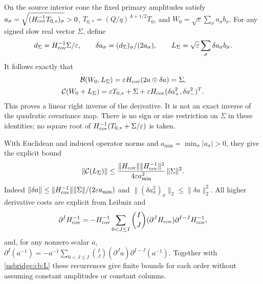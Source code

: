 \documentclass[11pt]{article}
\newcommand{\Cov}{\mathcal C}
\newcommand{\Cross}{\mathcal B}
\begin{document}
On the source interior cone the fixed primary amplitudes satisfy
$a_\sigma=\sqrt{(H_{\rm cov}^{-1}T_{0,*})_\sigma}>0$,
$T_{0,*}=(Q/q)^{A+1/2}T_0$, and
$W_0=\sqrt\varepsilon\sum_\sigma a_\sigma b_\sigma$.
For any signed slow real vector $\Sigma$, define
\begin{equation}
 d_\Sigma=H_{\rm cov}^{-1}\Sigma/\varepsilon,\qquad
 \delta a_\sigma=(d_\Sigma)_\sigma/(2a_\sigma),\qquad
 L_\Sigma=\sqrt\varepsilon\sum_\sigma\delta a_\sigma b_\sigma .
 \label{nsbridge:cb:L}
\end{equation}
It follows exactly that
\begin{gather}
 \Cross(W_0,L_\Sigma)=\varepsilon H_{\rm cov}(2a\odot\delta a)=\Sigma,
 \label{nsbridge:cb:inverse}\\
 \Cov(W_0+L_\Sigma)
   =\varepsilon T_{0,*}+\Sigma+
       \varepsilon H_{\rm cov}(\delta a_+^2,\delta a_-^2)^T.
 \label{nsbridge:cb:quad}
\end{gather}
This proves a linear right inverse of the derivative. It is not an
exact inverse of the quadratic covariance map. There is no sign or
size restriction on $\Sigma$ in these identities; no square root of
$H_{\rm cov}^{-1}(T_{0,*}+\Sigma/\varepsilon)$ is taken.

With Euclidean and induced operator norms and
$a_{\min}=\min_\sigma|a_\sigma|>0$, they give the explicit bound
\begin{equation}
 \|\Cov(L_\Sigma)\|\le
 \frac{\|H_{\rm cov}\|\|H_{\rm cov}^{-1}\|^2}
              {4\varepsilon a_{\min}^2}\,\|\Sigma\|^2. \label{nsbridge:cb:bound}
\end{equation}
Indeed $\|\delta a\|\le\|H_{\rm cov}^{-1}\|\|\Sigma\|/
(2\varepsilon a_{\min})$ and
$\|(\delta a_\sigma^2)_\sigma\|_2\le\|\delta a\|_2^2$.
All higher derivative costs are explicit from Leibniz and
\[
 \partial^I H_{\rm cov}^{-1}
 =-H_{\rm cov}^{-1}
 \sum_{0<J\le I}\binom{I}{J}(\partial^JH_{\rm cov})
                           \partial^{I-J}H_{\rm cov}^{-1},
\]
and, for any nonzero scalar $a$,
$\partial^I(a^{-1})=-a^{-1}\sum_{0<J\le I}\binom{I}{J}
(\partial^Ja)\partial^{I-J}(a^{-1})$.
Together with \eqref{nsbridge:cb:L} these recurrences give finite bounds for
each order without assuming constant amplitudes or constant columns.
\end{document}
